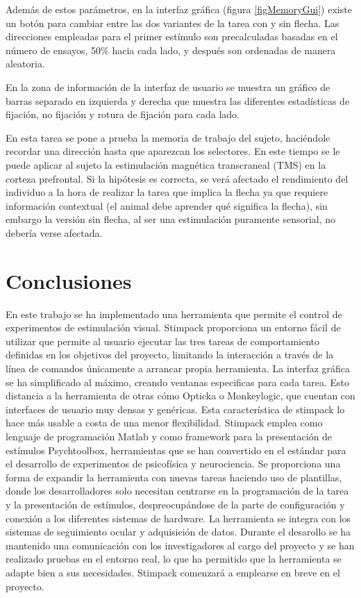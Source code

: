 \documentclass[conference]{IEEEtran}
\begin{document}
Además de estos parámetros, en la interfaz gráfica (figura \ref{figMemoryGui}) existe un botón para cambiar entre las dos variantes de la tarea con y sin flecha.
Las direcciones empleadas para el primer estímulo son precalculadas basadas en el número de ensayos, 50\% hacia cada lado, y después son ordenadas de manera aleatoria.

En la zona de información de la interfaz de usuario se muestra un gráfico de barras separado en izquierda y derecha que muestra las diferentes estadísticas de fijación, no fijación y rotura de fijación para cada lado.


En esta tarea se pone a prueba la memoria de trabajo del sujeto, haciéndole recordar una dirección hasta que aparezcan los selectores. En este tiempo se le puede aplicar al sujeto la estimulación magnética transcraneal (TMS) en la corteza prefrontal. Si la hipótesis es correcta, se verá afectado el rendimiento del individuo a la hora de realizar la tarea que implica la flecha ya que requiere información contextual (el animal debe aprender qué significa la flecha), sin embargo la versión sin flecha, al ser una estimulación puramente sensorial, no debería verse afectada.

\section{Conclusiones}

En este trabajo se ha implementado una herramienta que permite el control de experimentos de estimulación visual.
Stimpack proporciona un entorno fácil de utilizar que permite al usuario ejecutar las tres tareas de comportamiento definidas en los objetivos del proyecto, limitando la interacción a través de la línea de comandos únicamente a arrancar propia herramienta. La interfaz gráfica se ha simplificado al máximo, creando ventanas especificas para cada tarea. Esto distancia a la herramienta de otras cómo Opticka o Monkeylogic, que cuentan con interfaces de usuario muy densas y genéricas. Esta característica de stimpack lo hace más usable a costa de una menor flexibilidad.
Stimpack emplea como lenguaje de programación Matlab y como framework para la presentación de estímulos Psychtoolbox, herramientas que se han convertido en el estándar para el desarrollo de experimentos de psicofísica y neurociencia.
Se proporciona una forma de expandir la herramienta con nuevas tareas haciendo uso de plantillas, donde los desarrolladores solo necesitan centrarse en la programación de la tarea y la presentación de estímulos, despreocupándose de la parte de configuración y conexión a los diferentes sistemas de hardware.
La herramienta se integra con los sistemas de seguimiento ocular y adquisición de datos.
Durante el desarollo se ha mantenido una comunicación con los investigadores al cargo del proyecto y se han realizado pruebas en el entorno real, lo que ha permitido que la herramienta se adapte bien a sus necesidades. Stimpack comenzará a emplearse en breve en el proyecto.
\end{document}
